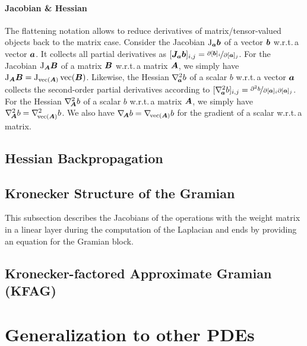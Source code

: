 \documentclass{article}
\begin{document}
\paragraph{Jacobian \& Hessian} The flattening notation allows to reduce derivatives of matrix/tensor-valued objects back to the matrix case.
Consider the Jacobian $\mathrm{J}_{{\bm{a}}}{\bm{b}}$ of a vector ${\bm{b}}$ w.r.t.\,a vector ${\bm{a}}$.
It collects all partial derivatives as $[{\bm{J}}_{{\bm{a}}}{\bm{b}}]_{i,j} = \nicefrac{\partial [{\bm{b}}]_i}{\partial [{\bm{a}}]_j}$.
For the Jacobian $\mathrm{J}_{{\bm{A}}}{\bm{B}}$ of a matrix ${\bm{B}}$ w.r.t.\,a matrix ${\bm{A}}$, we simply have $\mathrm{J}_{{\bm{A}}} {\bm{B}} = \mathrm{J}_{\operatorname{vec}( {\bm{A}} )}\operatorname{vec}({\bm{B}})$.
Likewise, the Hessian $\nabla_{\!{{\bm{a}}}}^{2}b$ of a scalar $b$ w.r.t.\,a vector ${\bm{a}}$ collects the second-order partial derivatives according to $[\nabla_{\!{{\bm{a}}}}^{2}b]_{i,j} = \nicefrac{\partial^2 b}{\partial [{\bm{a}}]_i \partial [{\bm{a}}]_j}$.
For the Hessian $\nabla_{\!{{\bm{A}}}}^{2} b$ of a scalar $b$ w.r.t.\,a matrix ${\bm{A}}$, we simply have $\nabla_{\!{{\bm{A}}}}^{2} b = \nabla_{\!{\operatorname{vec}({\bm{A}})}}^{2}b$.
We also have $\nabla_{\!{{\bm{A}}}} b = \nabla_{\!{\operatorname{vec}({\bm{A}})}} b$ for the gradient of a scalar w.r.t.\,a matrix.

\subsection{Hessian Backpropagation}\label{sec:laplacian-computation-graph}


\subsection{Kronecker Structure of the Gramian}\label{sec:kronecker-structure-gramian}

This subsection describes the Jacobians of the operations with the weight matrix in
a linear layer during the computation of the Laplacian and ends by providing an
equation for the Gramian block.

\subsection{Kronecker-factored Approximate Gramian (KFAG)}


\section{Generalization to other PDEs}


\end{document}

